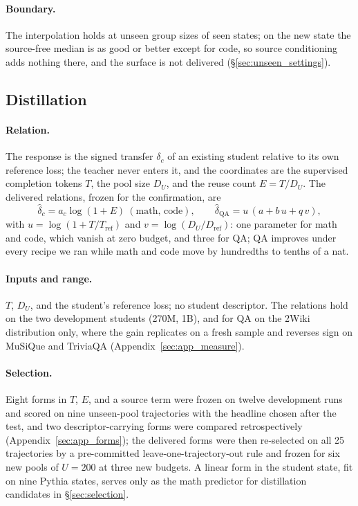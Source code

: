 \paragraph{Boundary.} The interpolation holds at unseen group sizes of
seen states; on the new state the source-free median is as good or
better except for code, so source conditioning adds nothing there,
and the surface is not delivered (\S\ref{sec:unseen_settings}).

\subsection{Distillation}
\label{sec:law_distill}

\paragraph{Relation.} The response is the signed transfer $\delta_c$ of
an existing student relative to its own reference loss; the teacher
never enters it, and the coordinates are the supervised completion
tokens $T$, the pool size $D_U$, and the reuse count $E=T/D_U$. The
delivered relations, frozen for the confirmation, are
\begin{equation}
\widehat\delta_c=a_c\log(1+E)\ (\text{math, code}),\qquad \widehat\delta_{\mathrm{QA}}=u\,(a+b\,u+q\,v),
\label{eq:kdforms}
\end{equation}
with $u=\log(1+T/T_{\mathrm{ref}})$ and $v=\log(D_U/D_{\mathrm{ref}})$: one parameter for math and code, which vanish at zero budget, and three for QA; QA improves under every recipe we ran while math and
code move by hundredths to tenths of a nat.
\paragraph{Inputs and range.} $T$, $D_U$, and the student's reference
loss; no student descriptor. The relations hold on the two
development students (270M, 1B), and for QA on the 2Wiki distribution
only, where the gain replicates on a fresh sample and reverses sign on
MuSiQue and TriviaQA (Appendix~\ref{sec:app_measure}).
\paragraph{Selection.} Eight forms in $T$, $E$, and a source term were
frozen on twelve development runs and scored on nine unseen-pool
trajectories with the headline chosen after the test, and two
descriptor-carrying forms were compared retrospectively
(Appendix~\ref{sec:app_forms}); the delivered forms were then
re-selected on all 25 trajectories by a pre-committed
leave-one-trajectory-out rule and frozen for six new pools of
$U{=}200$ at three new budgets. A linear form in the student state, fit on nine Pythia states, serves only as the math predictor for distillation candidates in \S\ref{sec:selection}.
